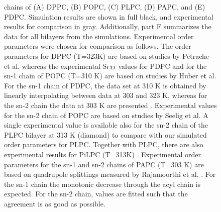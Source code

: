\documentclass[aps,prl,superscriptaddress,twocolumn]{revtex4}
\begin{document}
\begin{figure}[]
{   chains of (A) DPPC, (B) POPC, (C) PLPC, (D) PAPC, and (E) PDPC.
   Simulation results are shown in full black, and experimental results
   for comparison in gray. Additionally, part F summarizes the data for
   all bilayers from the simulations. Experimental order parameters were
   chosen for comparison as follows. The order parameters for DPPC (T=323K) 
   are based on studies by Petrache et al. \cite{petrache00} whereas the
   experimental S$_{{\rm CD}}$ values for PDPC and for the sn-1 chain of POPC (T=310 K) 
   are based on studies by Huber et al. \cite{huber02} For the sn-1 chain of
   PDPC, the data set at 310 K is obtained by linearly interpolating
   between data at 303 and 323 K, whereas for the sn-2 chain the data at
   303 K are presented \cite{huber02}. Experimental values for the sn-2 chain of POPC
   are based on studies by Seelig et al. \cite{seelig78} A single experimental value is
   available also for the sn-2 chain of the PLPC bilayer at 313 K
   (diamond) \cite{baenziger91} to compare with our simulated order parameters for PLPC.
   Together with PLPC, there are also experimental results for PiLPC (T=313K) \cite{baenziger91}. 
   Experimental order parameters for the sn-1 and sn-2 chains
   of PAPC (T=303 K) are based on quadrupole splittings measured by
   Rajamoorthi et al. \cite{rajamoorthi91}. For the sn-1 chain the monotonic decrease through
   the acyl chain is expected. For the sn-2 chain, values are fitted such
   that the agreement is as good as possible.
  } 
\end{figure}
\end{document}
